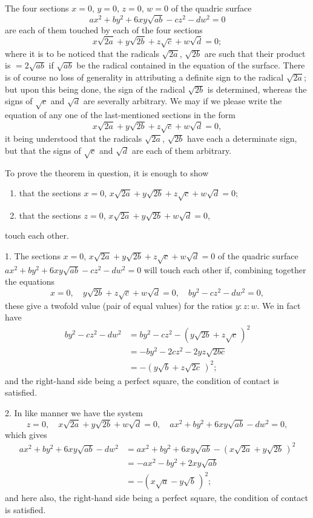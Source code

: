 \documentclass[11pt,a4paper]{article}
\theoremstyle{plain}
\begin{document}
The four sections $x = 0$, $y = 0$, $z = 0$, $w = 0$ of the quadric surface
\[
a x^2 + b y^2 + 6 xy\sqrt{ab} - c z^2 - d w^2 = 0
\]
are each of them touched by each of the four sections
\[
x\sqrt{2a} + y\sqrt{2b} + z\sqrt{c} + w\sqrt{d} = 0;
\]
where it is to be noticed that the radicals $\sqrt{2a}$, $\sqrt{2b}$ are such that their product is $= 2\sqrt{ab}$ if $\sqrt{ab}$ be the radical contained in the equation of the surface. There is of course no loss of generality in attributing a definite sign to the radical $\sqrt{2a}$; but upon this being done, the sign of the radical $\sqrt{2b}$ is determined, whereas the signs of $\sqrt{c}$ and $\sqrt{d}$ are severally arbitrary. We may if we please write the equation of any one of the last-mentioned sections in the form
\[
x\sqrt{2a} + y\sqrt{2b} + z\sqrt{c} + w\sqrt{d} = 0,
\]
it being understood that the radicals $\sqrt{2a}$, $\sqrt{2b}$ have each a determinate sign, but that the signs of $\sqrt{c}$ and $\sqrt{d}$ are each of them arbitrary.

To prove the theorem in question, it is enough to show
\begin{enumerate}[label=(\arabic*)]
\item that the sections $x = 0$, $x\sqrt{2a} + y\sqrt{2b} + z\sqrt{c} + w\sqrt{d} = 0$;
\item that the sections $z = 0$, $x\sqrt{2a} + y\sqrt{2b} + w\sqrt{d} = 0$,
\end{enumerate}
touch each other.

\medskip

1. The sections $x = 0$, $x\sqrt{2a} + y\sqrt{2b} + z\sqrt{c} + w\sqrt{d} = 0$ of the quadric surface $a x^2 + b y^2 + 6 xy\sqrt{ab} - c z^2 - d w^2 = 0$ will touch each other if, combining together the equations
\[
x = 0,\quad y\sqrt{2b} + z\sqrt{c} + w\sqrt{d} = 0,\quad b y^2 - c z^2 - d w^2 = 0,
\]
these give a twofold value (pair of equal values) for the ratios $y : z : w$. We in fact have
\begin{align*}
b y^2 - c z^2 - d w^2 &= b y^2 - c z^2 - (y\sqrt{2b} + z\sqrt{c}\,)^2\\
 &= -b y^2 - 2 c z^2 - 2 y z\sqrt{2bc}\\
 &= -(y\sqrt{b} + z\sqrt{2c}\,)^2;
\end{align*}
and the right-hand side being a perfect square, the condition of contact is satisfied.

\medskip

2. In like manner we have the system
\[
z = 0,\quad x\sqrt{2a} + y\sqrt{2b} + w\sqrt{d} = 0,\quad a x^2 + b y^2 + 6 xy\sqrt{ab} - d w^2 = 0,
\]
which gives
\begin{align*}
a x^2 + b y^2 + 6 xy\sqrt{ab} - d w^2 &= a x^2 + b y^2 + 6 xy\sqrt{ab} - (x\sqrt{2a} + y\sqrt{2b}\,)^2\\
 &= -a x^2 - b y^2 + 2 xy\sqrt{ab}\\
 &= -(x\sqrt{a} - y\sqrt{b}\,)^2;
\end{align*}
and here also, the right-hand side being a perfect square, the condition of contact is satisfied.
\end{document}

